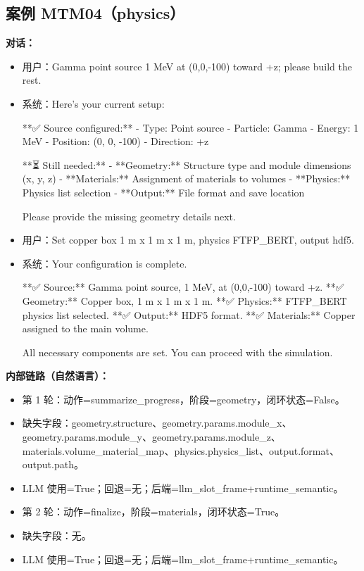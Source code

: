 \documentclass[11pt]{ctexart}
\begin{document}
\subsection{案例 MTM04（physics）}
\textbf{对话：}
\begin{itemize}
\item 用户：Gamma point source 1 MeV at (0,0,-100) toward +z; please build the rest.
\item 系统：Here's your current setup:

**✅ Source configured:**
- Type: Point source
- Particle: Gamma
- Energy: 1 MeV
- Position: (0, 0, -100)
- Direction: +z

**⏳ Still needed:**
- **Geometry:** Structure type and module dimensions (x, y, z)
- **Materials:** Assignment of materials to volumes
- **Physics:** Physics list selection
- **Output:** File format and save location

Please provide the missing geometry details next.
\item 用户：Set copper box 1 m x 1 m x 1 m, physics FTFP\_BERT, output hdf5.
\item 系统：Your configuration is complete.

**✅ Source:** Gamma point source, 1 MeV, at (0,0,-100) toward +z.
**✅ Geometry:** Copper box, 1 m x 1 m x 1 m.
**✅ Physics:** FTFP\_BERT physics list selected.
**✅ Output:** HDF5 format.
**✅ Materials:** Copper assigned to the main volume.

All necessary components are set. You can proceed with the simulation.
\end{itemize}
\textbf{内部链路（自然语言）：}
\begin{itemize}
\item 第 1 轮：动作=summarize\_progress，阶段=geometry，闭环状态=False。
\item 缺失字段：geometry.structure、geometry.params.module\_x、geometry.params.module\_y、geometry.params.module\_z、materials.volume\_material\_map、physics.physics\_list、output.format、output.path。
\item LLM 使用=True；回退=无；后端=llm\_slot\_frame+runtime\_semantic。
\item 第 2 轮：动作=finalize，阶段=materials，闭环状态=True。
\item 缺失字段：无。
\item LLM 使用=True；回退=无；后端=llm\_slot\_frame+runtime\_semantic。
\end{itemize}
\end{document}
